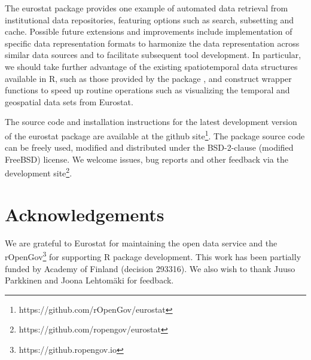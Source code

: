 The eurostat package provides one example of automated data retrieval
from institutional data repositories, featuring options such as
search, subsetting and cache. Possible future extensions and
improvements include implementation of specific data representation
formats to harmonize the data representation across similar data
sources and to facilitate subsequent tool development. In particular,
we should take further advantage of the existing spatiotemporal data
structures available in R, such as those provided by
the  package \cite{spacetime}, and construct
wrapper functions to speed up routine operations such as visualizing
the temporal and geospatial data sets from Eurostat.

The source code and installation instructions for the latest
development version of the eurostat package are available at the
github site\footnote{https://github.com/rOpenGov/eurostat}. The
package source code can be freely used, modified and distributed under
the BSD-2-clause (modified FreeBSD) license. We welcome issues, bug
reports and other feedback via the development
site\footnote{https://github.com/ropengov/eurostat}.


\section*{Acknowledgements}

We are grateful to Eurostat for maintaining the open data service and
the rOpenGov\footnote{https://github.ropengov.io} for supporting R
package development. This work has been partially funded by Academy of
Finland (decision 293316). We also wish to thank Juuso Parkkinen and
Joona Lehtom{\"a}ki for feedback.




\address{Leo Lahti\\
  Department of Mathematics and Statistics\\
  PO Box 20014 University of Turku\\
  Finland\\}

\address{Janne Huovari\\
  Affiliation\\
  Address\\
  Country\\}

\address{Markus Kainu\\
  Affiliation\\
  Address\\
  Country\\}

\address{Przemyslaw Biecek\\
  Faculty of Mathematics, Informatics, and Mechanics\\
  University of Warsaw\\
  Banacha 2, 02-097 Warsaw\\
  Poland\\}

